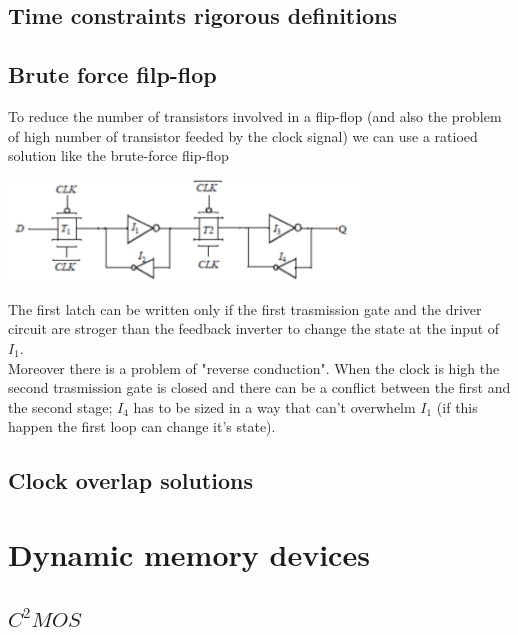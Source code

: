 \subsection{Time constraints rigorous definitions}





\subsection{Brute force filp-flop}

To reduce the number of transistors involved in a flip-flop (and also the problem of high number of transistor feeded by the clock signal) we can use a ratioed solution like the brute-force flip-flop

\centering
\includegraphics[width=0.7\textwidth]{C10_12.png}\\
\raggedright

The first latch can be written only if the first trasmission gate and the driver circuit are stroger than the feedback inverter to change the state at the input of $I_1$.\\
Moreover there is a problem of "reverse conduction". When the clock is high the second trasmission gate is closed and there can be a conflict between the first and the second stage; $I_4$ has to be sized in a way that can't overwhelm $I_1$ (if this happen the first loop can change it's state).\\

\subsection{Clock overlap solutions}



\section{Dynamic memory devices}

\subsection{$C^2 MOS$}


